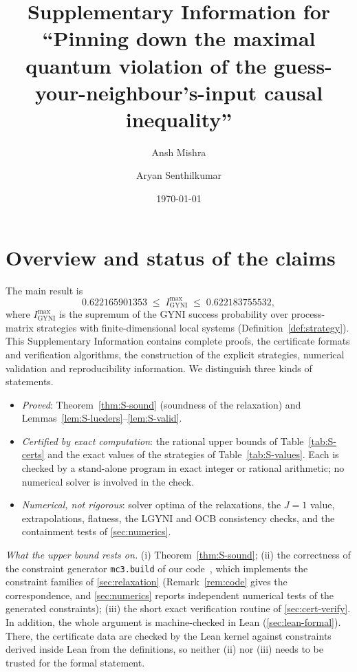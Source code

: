 \documentclass[aps,pra,onecolumn,notitlepage,superscriptaddress,longbibliography,nofootinbib,11pt]{revtex4-2}
\theoremstyle{remark}
\newcommand{\Imax}{I_{\mathrm{GYNI}}^{\max}}
\newcommand{\file}[1]{\texttt{#1}}
\begin{document}
\title{Supplementary Information for ``Pinning down the maximal quantum violation of the guess-your-neighbour's-input causal inequality''}

\author{Ansh Mishra}
\author{Aryan Senthilkumar}

\date{\today}

\maketitle

\section{Overview and status of the claims}\label{sec:overview}

The main result is
\begin{equation}
0.622165901353\;\le\;\Imax\;\le\;0.622183755532 ,
\label{eq:S-main}
\end{equation}
where $\Imax$ is the supremum of the GYNI success probability over process-matrix strategies with finite-dimensional local systems (Definition~\ref{def:strategy}). This Supplementary Information contains complete proofs, the certificate formats and verification algorithms, the construction of the explicit strategies, numerical validation and reproducibility information. We distinguish three kinds of statements.
\begin{itemize}
\item \emph{Proved}: Theorem~\ref{thm:S-sound} (soundness of the relaxation) and Lemmas~\ref{lem:S-lueders}--\ref{lem:S-valid}.
\item \emph{Certified by exact computation}: the rational upper bounds of Table~\ref{tab:S-certs} and the exact values of the strategies of Table~\ref{tab:S-values}. Each is checked by a stand-alone program in exact integer or rational arithmetic; no numerical solver is involved in the check.
\item \emph{Numerical, not rigorous}: solver optima of the relaxations, the $J=1$ value, extrapolations, flatness, the LGYNI and OCB consistency checks, and the containment tests of \ref{sec:numerics}.
\end{itemize}

\emph{What the upper bound rests on.} (i) Theorem~\ref{thm:S-sound}; (ii) the correctness of the constraint generator \file{mc3.build} of our code~\cite{repo}, which implements the constraint families of \ref{sec:relaxation} (Remark~\ref{rem:code} gives the correspondence, and \ref{sec:numerics} reports independent numerical tests of the generated constraints); (iii) the short exact verification routine of \ref{sec:cert-verify}. In addition, the whole argument is machine-checked in Lean (\ref{sec:lean-formal}). There, the certificate data are checked by the Lean kernel against constraints derived inside Lean from the definitions, so neither (ii) nor (iii) needs to be trusted for the formal statement.
\end{document}
